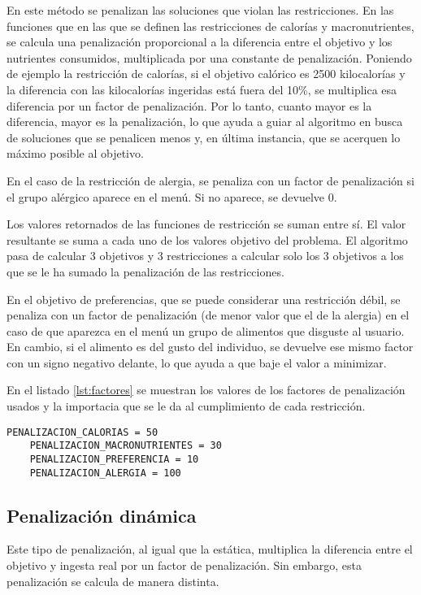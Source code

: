 En este método se penalizan las soluciones que violan las restricciones. En las funciones que en las que se definen las restricciones de calorías y macronutrientes, se calcula una penalización proporcional a la diferencia entre el objetivo y los nutrientes consumidos, multiplicada por una constante de penalización. Poniendo de ejemplo la restricción de calorías, si el objetivo calórico es 2500 kilocalorías y la diferencia con las kilocalorías ingeridas está fuera del 10\%, se multiplica esa diferencia por un factor de penalización. Por lo tanto, cuanto mayor es la diferencia, mayor es la penalización, lo que ayuda a guiar al algoritmo en busca de soluciones que se penalicen menos y, en última instancia, que se acerquen lo máximo posible al objetivo.

En el caso de la restricción de alergia, se penaliza con un factor de penalización si el grupo alérgico aparece en el menú. Si no aparece, se devuelve 0.

Los valores retornados de las funciones de restricción se suman entre sí. El valor resultante se suma a cada uno de los valores objetivo del problema. El algoritmo pasa de calcular 3 objetivos y 3 restricciones a calcular solo los 3 objetivos a los que se le ha sumado la penalización de las restricciones.

En el objetivo de preferencias, que se puede considerar una restricción débil, se penaliza con un factor de penalización (de menor valor que el de la alergia) en el caso de que aparezca en el menú un grupo de alimentos que disguste al usuario. En cambio, si el alimento es del gusto del individuo, se devuelve ese mismo factor con un signo negativo delante, lo que ayuda a que baje el valor a minimizar.

En el listado \ref{lst:factores} se muestran los valores de los factores de penalización usados y la importacia que se le da al cumplimiento de cada restricción.
\newpage
\begin{lstlisting}[basicstyle=\ttfamily, caption=Factores de penalización.,label={lst:factores}]
    PENALIZACION_CALORIAS = 50
    PENALIZACION_MACRONUTRIENTES = 30
    PENALIZACION_PREFERENCIA = 10
    PENALIZACION_ALERGIA = 100
\end{lstlisting}

\subsection{Penalización dinámica}
\label{ch:penalizacion-dinamica}

Este tipo de penalización, al igual que la estática, multiplica la diferencia entre el objetivo y ingesta real por un factor de penalización. Sin embargo, esta penalización se calcula de manera distinta.

